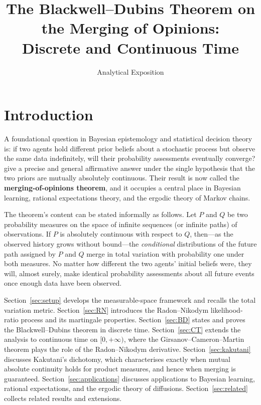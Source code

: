 \documentclass[12pt]{article}
\title{The Blackwell--Dubins Theorem on the Merging of Opinions:\\
       Discrete and Continuous Time}
\author{Analytical Exposition}
\date{}
\begin{document}
\maketitle
\tableofcontents
\bigskip

\section{Introduction}

A foundational question in Bayesian epistemology and statistical decision
theory is: if two agents hold different prior beliefs about a stochastic
process but observe the same data indefinitely, will their probability
assessments eventually converge?  \citet{blackwell1962} give a precise and
general affirmative answer under the single hypothesis that the two priors
are mutually absolutely continuous.  Their result is now called the
\textbf{merging-of-opinions theorem}, and it occupies a central place in
Bayesian learning, rational expectations theory, and the ergodic theory of
Markov chains.

The theorem's content can be stated informally as follows.  Let $P$ and $Q$
be two probability measures on the space of infinite sequences (or infinite
paths) of observations.  If $P$ is absolutely continuous with respect to $Q$,
then---as the observed history grows without bound---the \emph{conditional}
distributions of the future path assigned by $P$ and $Q$ merge in total
variation with probability one under both measures.  No matter how different
the two agents' initial beliefs were, they will, almost surely, make
identical probability assessments about all future events once enough data
have been observed.

Section~\ref{sec:setup} develops the measurable-space framework and recalls
the total variation metric.  Section~\ref{sec:RN} introduces the
Radon--Nikodym likelihood-ratio process and its martingale properties.
Section~\ref{sec:BD} states and proves the Blackwell--Dubins theorem in
discrete time.  Section~\ref{sec:CT} extends the analysis to continuous
time on $[0, +\infty)$, where the Girsanov--Cameron--Martin theorem plays
the role of the Radon--Nikodym derivative.
Section~\ref{sec:kakutani} discusses Kakutani's dichotomy, which characterises
exactly when mutual absolute continuity holds for product measures, and
hence when merging is guaranteed.  Section~\ref{sec:applications} discusses
applications to Bayesian learning, rational expectations, and the ergodic
theory of diffusions.  Section~\ref{sec:related} collects related results
and extensions.
\end{document}
